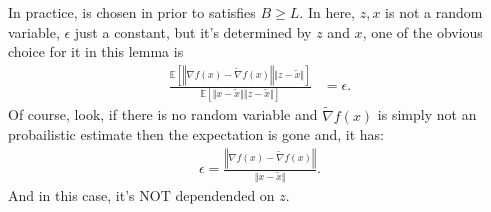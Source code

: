\documentclass[12pt]{article}
\newcommand{\expect}{\ensuremath{\mathbb E}}
\begin{document}
        \begin{remark}
            In practice, is chosen in prior to satisfies $B \ge L$. 
            In here, $z, x$ is not a random variable, $\epsilon$ just a constant, but it's determined by $z$ and $x$, one of the obvious choice for it in this lemma is
            \begin{align*}
                \frac{
                \expect \left[
                    \left\Vert \nabla f(x) - \tilde \nabla f(x) \right\Vert \Vert z - \tilde x\Vert
                \right]
                }{
                \expect \left[
                    \Vert x - \tilde x\Vert\Vert z - \tilde x\Vert
                \right]
                } &= \epsilon. 
            \end{align*}
            Of course, look, if there is no random variable and $\tilde \nabla f(x)$ is simply not an probailistic estimate then the expectation is gone and, it has: 
            \begin{align*}
                \epsilon = \frac{\left\Vert
                    \nabla f(x) - \tilde \nabla f(x)
                \right\Vert}{\Vert x - \tilde x\Vert}.
            \end{align*}
            And in this case, it's NOT dependended on $z$. 
        \end{remark}
\end{document}
